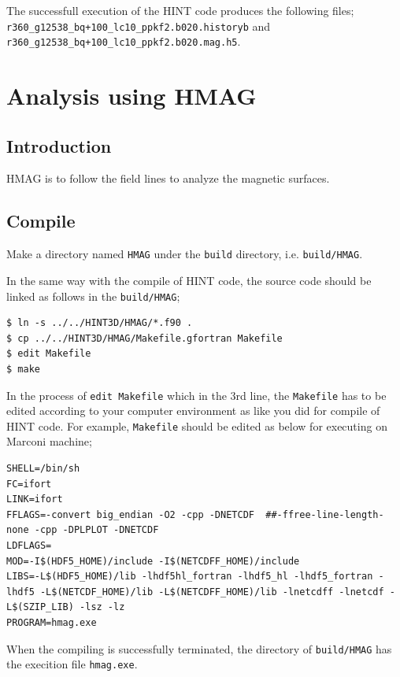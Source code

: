 \documentclass[10pt]{ltxdoc} %
\begin{document}
The successfull execution of the HINT code produces the following files;
\texttt{r360\_g12538\_bq+100\_lc10\_ppkf2.b020.historyb} and \texttt{r360\_g12538\_bq+100\_lc10\_ppkf2.b020.mag.h5}.


\section{Analysis using HMAG}
\subsection{Introduction}
HMAG is to follow the field lines to analyze the magnetic surfaces. 

\subsection{Compile}
  Make a directory named \texttt{HMAG} under the \texttt{build} directory, i.e. \texttt{build/HMAG}. 

In the same way with the compile of HINT code, the source code should be linked as follows in the \texttt{build/HMAG};
\vspace{2mm}
\begin{verbatim}
$ ln -s ../../HINT3D/HMAG/*.f90 .
$ cp ../../HINT3D/HMAG/Makefile.gfortran Makefile
$ edit Makefile
$ make
\end{verbatim}
\vspace{2mm}

In the process of \texttt{edit Makefile} which in the 3rd line, the \texttt{Makefile} has to be edited according to your computer environment as like you did for compile of HINT code. 
For example, \texttt{Makefile} should be edited as below for executing on Marconi machine;
\vspace{2mm}
\begin{verbatim}
SHELL=/bin/sh
FC=ifort
LINK=ifort
FFLAGS=-convert big_endian -O2 -cpp -DNETCDF  ##-ffree-line-length-none -cpp -DPLPLOT -DNETCDF
LDFLAGS=
MOD=-I$(HDF5_HOME)/include -I$(NETCDFF_HOME)/include
LIBS=-L$(HDF5_HOME)/lib -lhdf5hl_fortran -lhdf5_hl -lhdf5_fortran -lhdf5 -L$(NETCDF_HOME)/lib -L$(NETCDFF_HOME)/lib -lnetcdff -lnetcdf -L$(SZIP_LIB) -lsz -lz
PROGRAM=hmag.exe
\end{verbatim}
\vspace{2mm}

When the compiling is successfully terminated, the directory of \texttt{build/HMAG} has the execition file \texttt{hmag.exe}.
\end{document}
